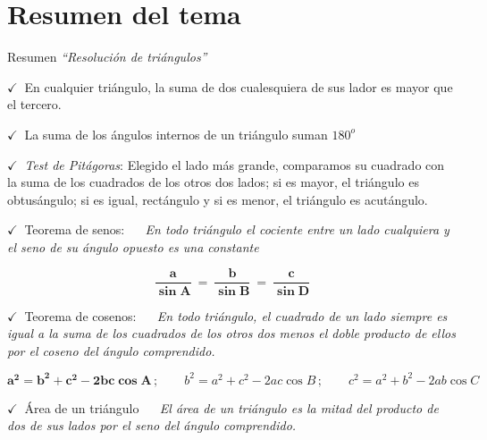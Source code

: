\section{Resumen del tema}
\vspace{0.5cm}
\begin{myblock}{Resumen \emph{``Resolución de triángulos''}}
\vspace{1mm}

\vspace{1mm} $\checkmark\ $ En cualquier triángulo, la suma de dos cualesquiera de sus lador es mayor que el tercero.

\vspace{1mm} $\checkmark\ $ La suma de los ángulos internos de un triángulo suman $180^o$

\vspace{1mm}\begin{footnotesize} $\checkmark\ $ 
\emph{Test de Pitágoras}:  Elegido el lado más grande, comparamos su cuadrado con la suma de los cuadrados de los otros dos lados; si es mayor, el triángulo es obtusángulo; si es igual, rectángulo y si es menor, el triángulo es acutángulo.	
\end{footnotesize}


\vspace{1mm} $\checkmark\ $ Teorema de senos: $\quad $ \emph{En todo triángulo el cociente entre un lado cualquiera y el seno de su ángulo opuesto es una constante}

$$ \boldsymbol{ \dfrac{a}{\sin A} \ = \  \dfrac{b}{\sin B} \ = \  \dfrac{c}{\sin D} } $$

\vspace{1mm} $\checkmark\ $ Teorema de cosenos: $\quad $ \emph{En todo triángulo, el cuadrado de un lado siempre es igual a la suma de los cuadrados de los otros dos menos el doble producto de ellos por el coseno del ángulo comprendido.}
	
	$$\boldsymbol{ a^2=b^2+c^2-2bc\cos A} \, ;  \qquad  b^2=a^2+c^2-2ac\cos B \, ; \qquad c^2=a^2+b^2-2ab\cos C $$
	
\vspace{1mm} $\checkmark\ $ Área de un triángulo $\quad$ \emph{El área de un triángulo es la mitad del producto de dos de sus lados por el seno del ángulo comprendido.}


\end{myblock}
